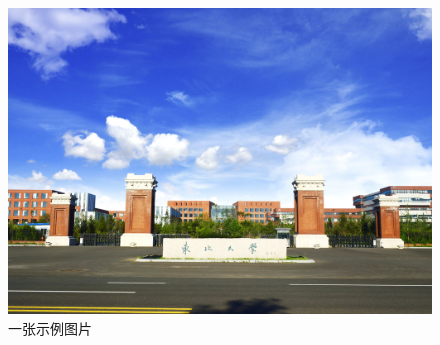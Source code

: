 \xiaosi


\begin{figure}[H]
    \centering
    \includegraphics[width=0.8\linewidth]{img/fig1.jpg}
    \caption{一张示例图片}
    \label{fig:figure3}
\end{figure}